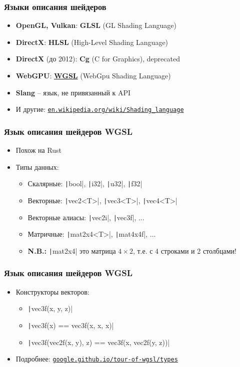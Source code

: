 \documentclass[10pt]{beamer}
\begin{document}
\begin{frame}[fragile]
\frametitle{Языки описания шейдеров}
\begin{itemize}
\item \textbf{OpenGL, Vulkan}: \textbf{GLSL} (GL Shading Language)
\pause
\item \textbf{DirectX}: \textbf{HLSL} (High-Level Shading Language)
\pause
\item \textbf{DirectX} (до 2012): \textbf{Cg} (C for Graphics), deprecated
\pause
\item \textbf{WebGPU}: \textbf{\alert{\underline{WGSL}}} (WebGpu Shading Language)
\pause
\item \textbf{Slang} -- язык, не привязанный к API
\pause
\item И другие: \href{https://en.wikipedia.org/wiki/Shading_language}{\nolinkurl{en.wikipedia.org/wiki/Shading\_language}}
\end{itemize}
\end{frame}

\begin{frame}[fragile]
\frametitle{Язык описания шейдеров WGSL}
\begin{itemize}
\item Похож на Rust
\pause
\item Типы данных:
\pause
\begin{itemize}
\item Скалярные: \texttt|bool|, \texttt|i32|, \texttt|u32|, \texttt|f32|
\pause
\item Векторные: \texttt|vec2<T>|, \texttt|vec3<T>|, \texttt|vec4<T>|
\pause
\item Векторные алиасы: \texttt|vec2i|, \texttt|vec3f|, ...
\pause
\item Матричные: \texttt|mat2x4<T>|, \texttt|mat4x4f|, ...
\pause
\item \textbf{N.B.:} \texttt|mat2x4| это матрица \(4\times 2\), т.е. с 4 строками и 2 столбцами!
\end{itemize}
\end{itemize}
\end{frame}

\begin{frame}[fragile]
\frametitle{Язык описания шейдеров WGSL}
\begin{itemize}
\item Конструкторы векторов:
\pause
\begin{itemize}
\item \texttt|vec3f(x, y, z)|
\pause
\item \texttt|vec3f(x) == vec3f(x, x, x)|
\pause
\item \texttt|vec3f(vec2f(x, y), z) == vec3f(x, vec2f(y, z))|
\end{itemize}
\pause
\item Подробнее: \href{hhttps://google.github.io/tour-of-wgsl/types}{\nolinkurl{google.github.io/tour-of-wgsl/types}}
\end{itemize}
\end{frame}
\end{document}
